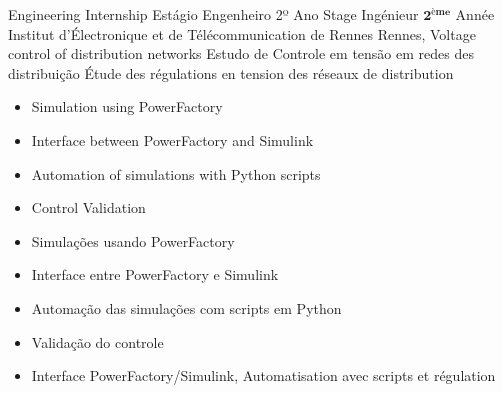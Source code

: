 \cventry{\jul\ 2017 \newline \aug\ 2017 \newline}
{
  \ml
  {Engineering Internship}
  {Estágio Engenheiro 2º Ano}
  {Stage Ingénieur $ \mathbf{2^{ème}} $ Année}}
{\newline Institut d'Électronique et de Télécommunication de Rennes}
{\newline Rennes, }
{\newline
  \ml
  {Voltage control of distribution networks}
  {Estudo de Controle em tensão em redes des distribuição}
  {Étude des régulations en tension des réseaux de distribution}}
{\ml
  {
    \begin{itemize}
    \item Simulation using PowerFactory
    \item Interface between PowerFactory and Simulink
    \item Automation of simulations with Python scripts
    \item Control Validation
    \end{itemize}
  }
  {
    \begin{itemize}
    \item Simulações usando PowerFactory
    \item Interface entre PowerFactory e Simulink
    \item Automação das simulações com scripts em Python
    \item Validação do controle
    \end{itemize}
  }
  {
    \begin{itemize}
    \item Interface PowerFactory/Simulink, Automatisation avec scripts et régulation
    \end{itemize}
  }
}

